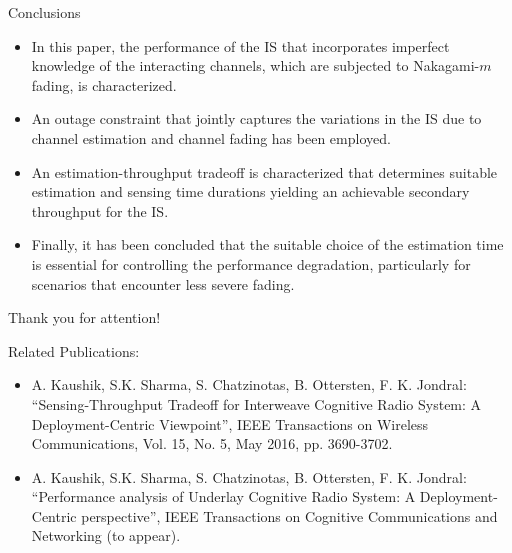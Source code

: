 \documentclass[12pt]{beamer}
\newcommand{\fs}[2]{\fontsize{#1 pt}{#2}\selectfont}
\begin{document}
\begin{frame}{Conclusions}
\fs{8}{8}
\begin{center}
\begin{itemize}
\item In this paper, the performance of the IS that incorporates imperfect knowledge of the interacting channels, which are subjected to Nakagami-$m$ fading, is characterized. \\[0.3cm]
\item An outage constraint that jointly captures the variations in the IS due to channel estimation and channel fading has been employed. \\[0.3cm]
\item An estimation-throughput tradeoff is characterized that determines suitable estimation and sensing time durations yielding an achievable secondary throughput for the IS. \\[0.3cm]
\item Finally, it has been concluded that the suitable choice of the estimation time is essential for controlling the performance degradation, particularly for scenarios that encounter less severe fading. 
\end{itemize}
\end{center}
\end{frame}

\begin{frame}{}
\begin{center}
Thank you for attention! \\
\end{center}
\fs{7}{7}
Related Publications:\\
\begin{itemize} 
\item A. Kaushik, S.K. Sharma, S. Chatzinotas, B. Ottersten,  F. K. Jondral: ``Sensing-Throughput Tradeoff for Interweave Cognitive Radio System: A Deployment-Centric Viewpoint'', IEEE Transactions on Wireless Communications, Vol. 15, No. 5, May 2016, pp. 3690-3702. \\
\item A. Kaushik, S.K. Sharma, S. Chatzinotas, B. Ottersten,  F. K. Jondral: ``Performance analysis of Underlay Cognitive Radio System: A Deployment-Centric perspective'', IEEE Transactions on Cognitive Communications and Networking (to appear).
\end{itemize} 
\end{frame}

\end{document}
